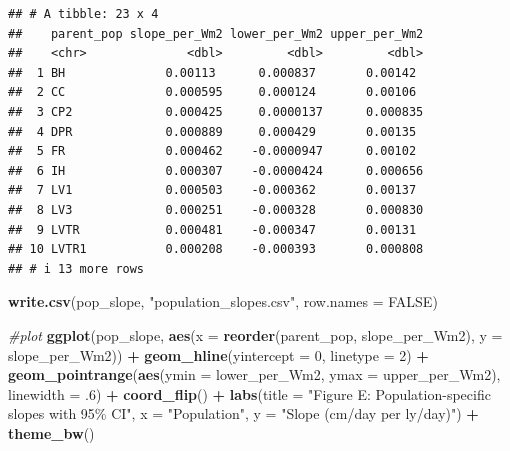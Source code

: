 \documentclass[
]{article}
\newenvironment{Shaded}{\begin{snugshade}}{\end{snugshade}}
\newcommand{\AttributeTok}[1]{\textcolor[rgb]{0.13,0.29,0.53}{#1}}
\newcommand{\CommentTok}[1]{\textcolor[rgb]{0.56,0.35,0.01}{\textit{#1}}}
\newcommand{\ConstantTok}[1]{\textcolor[rgb]{0.56,0.35,0.01}{#1}}
\newcommand{\DecValTok}[1]{\textcolor[rgb]{0.00,0.00,0.81}{#1}}
\newcommand{\FunctionTok}[1]{\textcolor[rgb]{0.13,0.29,0.53}{\textbf{#1}}}
\newcommand{\NormalTok}[1]{#1}
\newcommand{\SpecialCharTok}[1]{\textcolor[rgb]{0.81,0.36,0.00}{\textbf{#1}}}
\newcommand{\StringTok}[1]{\textcolor[rgb]{0.31,0.60,0.02}{#1}}
\begin{document}
\begin{verbatim}
## # A tibble: 23 x 4
##    parent_pop slope_per_Wm2 lower_per_Wm2 upper_per_Wm2
##    <chr>              <dbl>         <dbl>         <dbl>
##  1 BH              0.00113      0.000837       0.00142 
##  2 CC              0.000595     0.000124       0.00106 
##  3 CP2             0.000425     0.0000137      0.000835
##  4 DPR             0.000889     0.000429       0.00135 
##  5 FR              0.000462    -0.0000947      0.00102 
##  6 IH              0.000307    -0.0000424      0.000656
##  7 LV1             0.000503    -0.000362       0.00137 
##  8 LV3             0.000251    -0.000328       0.000830
##  9 LVTR            0.000481    -0.000347       0.00131 
## 10 LVTR1           0.000208    -0.000393       0.000808
## # i 13 more rows
\end{verbatim}

\begin{Shaded}
\begin{Highlighting}[]
\FunctionTok{write.csv}\NormalTok{(pop\_slope, }\StringTok{"population\_slopes.csv"}\NormalTok{, }\AttributeTok{row.names =} \ConstantTok{FALSE}\NormalTok{)}

\CommentTok{\#plot}
\FunctionTok{ggplot}\NormalTok{(pop\_slope, }\FunctionTok{aes}\NormalTok{(}\AttributeTok{x =} \FunctionTok{reorder}\NormalTok{(parent\_pop, slope\_per\_Wm2), }\AttributeTok{y =}\NormalTok{ slope\_per\_Wm2)) }\SpecialCharTok{+}
  \FunctionTok{geom\_hline}\NormalTok{(}\AttributeTok{yintercept =} \DecValTok{0}\NormalTok{, }\AttributeTok{linetype =} \DecValTok{2}\NormalTok{) }\SpecialCharTok{+}
  \FunctionTok{geom\_pointrange}\NormalTok{(}\FunctionTok{aes}\NormalTok{(}\AttributeTok{ymin =}\NormalTok{ lower\_per\_Wm2, }\AttributeTok{ymax =}\NormalTok{ upper\_per\_Wm2), }\AttributeTok{linewidth =}\NormalTok{ .}\DecValTok{6}\NormalTok{) }\SpecialCharTok{+}
  \FunctionTok{coord\_flip}\NormalTok{() }\SpecialCharTok{+}
  \FunctionTok{labs}\NormalTok{(}\AttributeTok{title =} \StringTok{"Figure E: Population{-}specific slopes with 95\% CI"}\NormalTok{,}
       \AttributeTok{x =} \StringTok{"Population"}\NormalTok{, }\AttributeTok{y =} \StringTok{"Slope (cm/day per ly/day)"}\NormalTok{) }\SpecialCharTok{+}
  \FunctionTok{theme\_bw}\NormalTok{()}
\end{Highlighting}
\end{Shaded}
\end{document}
